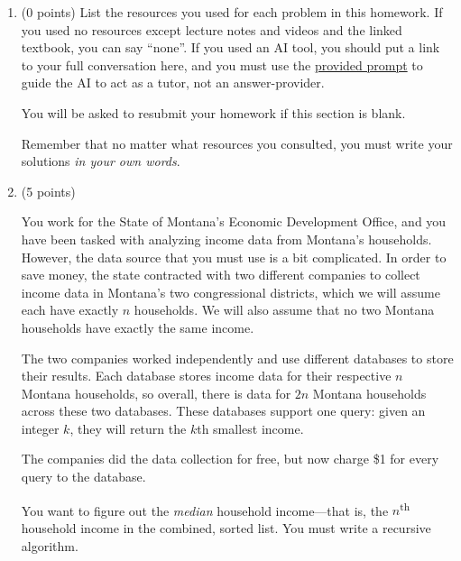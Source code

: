 \documentclass[11pt]{article}
\begin{document}


\begin{enumerate}


\item (0 points) List the resources you used for each problem in this homework. If you used no resources except
lecture notes and videos and the linked textbook, you can say ``none''. If you used
an AI tool, you should put a link to your full conversation here, and you must
use the
\href{https://umaal.org/files/teaching/csci332_fall2026/agents.md}{provided
prompt}
 to guide the AI to act
as a tutor, not an answer-provider.

You will be asked to resubmit your homework if this section is blank.

Remember that no matter what resources you consulted, you must write your solutions
\emph{in your own words}.

\item (5 points)

You work for the State of Montana's Economic Development Office, and you have been tasked with analyzing income data from Montana's households. However, the data source that you must use is a bit complicated.
In order to save money, the state contracted with two different companies to collect income data in Montana's two congressional districts, which we will assume each have exactly $n$ households. We will also assume that no two Montana households have exactly the same income.

The two companies worked independently and use different databases to store their results. Each database stores income data for their respective $n$ Montana households, so overall, there is data for $2n$ Montana households across these two databases. These databases support one query: given an integer $k$, they will return the $k$th smallest income.

The companies did the data collection for free, but now charge \$1 for every query to the database.

You want to figure out the \emph{median} household income---that is, the
$n$\textsuperscript{th} household income in the combined, sorted list.
You must write a recursive algorithm.




\end{enumerate}
\end{document}
